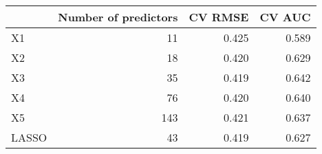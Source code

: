 
\begin{tabular}{lrrr}
\toprule
  & Number of predictors & CV RMSE & CV AUC\\
\midrule
X1 & 11 & 0.425 & 0.589\\
X2 & 18 & 0.420 & 0.629\\
X3 & 35 & 0.419 & 0.642\\
X4 & 76 & 0.420 & 0.640\\
X5 & 143 & 0.421 & 0.637\\
LASSO & 43 & 0.419 & 0.627\\
\bottomrule
\end{tabular}